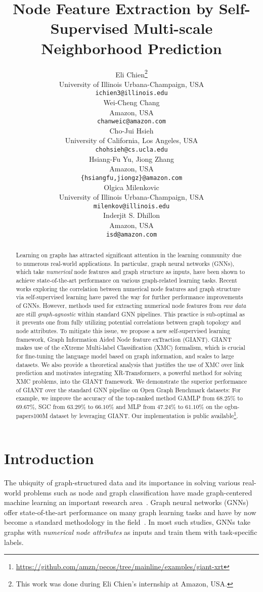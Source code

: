 \documentclass{article} \usepackage{iclr2022_conference,times}
\title{Node Feature Extraction by Self-Supervised Multi-scale Neighborhood Prediction}
\author{Eli Chien\thanks{This work was done during Eli Chien’s internship at Amazon, USA.} \\
University of Illinois Urbana-Champaign, USA\\
\texttt{ichien3@illinois.edu} \\
\And
Wei-Cheng Chang \\
Amazon, USA \\
\texttt{chanweic@amazon.com} \\
\AND
Cho-Jui Hsieh \\
University of California, Los Angeles, USA\\
\texttt{chohsieh@cs.ucla.edu} \\
\And
Hsiang-Fu Yu,  Jiong Zhang \\
Amazon, USA \\
\texttt{\{hsiangfu,jiongz\}@amazon.com} \\
\AND
Olgica Milenkovic\\
University of Illinois Urbana-Champaign, USA\\
\texttt{milenkov@illinois.edu}\\
\And
Inderjit S. Dhillon\\
Amazon, USA \\
\texttt{isd@amazon.com} \\
}
\begin{document}
\maketitle

\begin{abstract}
Learning on graphs has attracted significant attention in the learning community due to numerous real-world applications. In particular, graph neural networks (GNNs), which take \emph{numerical} node features and graph structure as inputs, have been shown to achieve state-of-the-art performance on various graph-related learning tasks. Recent works exploring the correlation between numerical node features and graph structure via self-supervised learning have paved the way for further performance improvements of GNNs. However, methods used for extracting numerical node features from \emph{raw data} are still \emph{graph-agnostic} within standard GNN pipelines. This practice is sub-optimal as it prevents one from fully utilizing potential correlations between graph topology and node attributes. To mitigate this issue, we propose a new self-supervised learning framework, Graph Information Aided Node feature exTraction (GIANT). GIANT makes use of the eXtreme Multi-label Classification (XMC) formalism, which is crucial for fine-tuning the language model based on graph information, and scales to large datasets. We also provide a theoretical analysis that justifies the use of XMC over link prediction and motivates integrating XR-Transformers, a powerful method for solving XMC problems, into the GIANT framework. We demonstrate the superior performance of GIANT over the standard GNN pipeline on Open Graph Benchmark datasets: For example, we improve the accuracy of the top-ranked method GAMLP from $68.25\%$ to $69.67\%$, SGC from $63.29\%$ to $66.10\%$ and MLP from $47.24\%$ to $61.10\%$ on the ogbn-papers100M dataset by leveraging GIANT. Our implementation is public available\footnote{\url{https://github.com/amzn/pecos/tree/mainline/examples/giant-xrt}}. 
\end{abstract}

\vspace{-0.5cm}
\section{Introduction}
The ubiquity of graph-structured data and its importance in solving various real-world problems such as node and graph classification have made graph-centered machine learning an important research area~\citep{lu2011link,shervashidze2011weisfeiler,zhu2005semi}. Graph neural networks (GNNs) offer state-of-the-art performance on many graph learning tasks and have by now become a standard methodology in the field~\citep{kipf2017semi,hamilton2017inductive,velickovic2018graph,chien2020adaptive}. In most such studies, GNNs take graphs with \emph{numerical node attributes} as inputs and train them with task-specific labels. 
\end{document}
